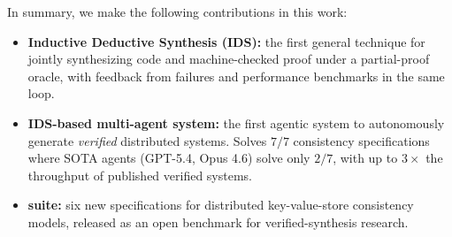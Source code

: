 

\noindent In summary, we make the following contributions in this work:
\begin{itemize}[leftmargin=*,nosep]
\item \textbf{Inductive Deductive Synthesis (IDS):} the first general technique for jointly synthesizing code and machine-checked proof under a partial-proof oracle, with feedback from failures and performance benchmarks in the same loop.
\item \textbf{IDS-based multi-agent system:} the first agentic system to autonomously generate \textit{verified} distributed systems. Solves $7/7$ consistency specifications where SOTA agents (GPT-5.4, Opus 4.6) solve only $2/7$, with up to $3\times$ the throughput of published verified systems.
\item \textbf{\sys{} suite:} six new \coq{} specifications for distributed key-value-store consistency models, released as an open benchmark for verified-synthesis research.
\end{itemize}







